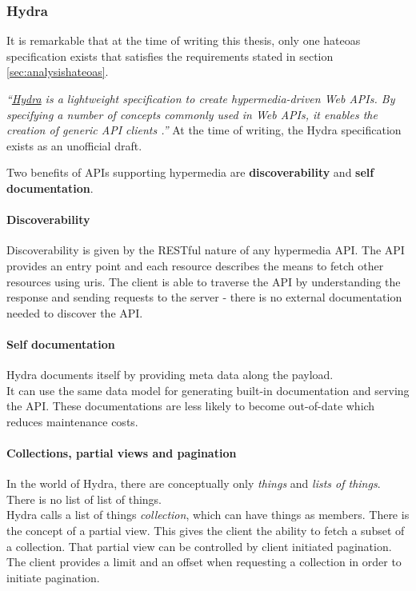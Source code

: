 \subsubsection{Hydra}
It is remarkable that at the time of writing this thesis, only one \gls{hateoas} specification exists that satisfies the requirements stated in section \ref{sec:analysishateoas}.

\textit{``\href{http://www.hydra-cg.com/}{Hydra} is a lightweight specification to create hypermedia-driven Web APIs. By specifying a number of concepts commonly used in Web APIs, it enables the creation of generic API clients \citep{hydraspecs}.''} At the time of writing, the Hydra specification exists as an unofficial draft.

Two benefits of APIs supporting hypermedia are \textbf{discoverability} and \textbf{self documentation}.

\paragraph{Discoverability} Discoverability is given by the RESTful nature of any hypermedia API. The API provides an entry point and each resource describes the means to fetch other resources using \gls{uri}s. The client is able to traverse the API by understanding the response and sending requests to the server - there is no external documentation needed to discover the API.

\paragraph{Self documentation}
Hydra documents itself by providing meta data along the payload. \\
It can use the same data model for generating built-in documentation and serving the API. These documentations are less likely to become out-of-date which reduces maintenance costs.

\paragraph{Collections, partial views and pagination}
In the world of Hydra, there are conceptually only \textit{things} and \textit{lists of things}. There is no list of list of things. \\
Hydra calls a list of things \textit{collection}, which can have things as members. There is the concept of a partial view. This gives the client the ability to fetch a subset of a collection. That partial view can be controlled by client initiated \gls{pagination}. The client provides a limit and an offset when requesting a collection in order to initiate \gls{pagination}.

